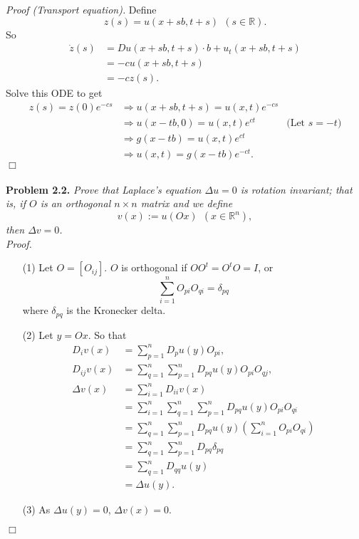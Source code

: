 \documentclass{article}
\begin{document}
\emph{Proof (Transport equation).}
Define
\[
  z(s) = u(x+sb,t+s) \:\: (s \in \mathbb{R}).
\]
So
\begin{align*}
  \dot{z}(s)
  &= Du(x+sb,t+s) \cdot b + u_t(x+sb,t+s) \\
  &= -cu(x+sb,t+s) \\
  &= -cz(s).
\end{align*}
Solve this ODE to get
\begin{align*}
  z(s) = z(0) e^{-cs}
  &\Longrightarrow
  u(x+sb,t+s) = u(x,t) e^{-cs} \\
  &\Longrightarrow
  u(x-tb,0) = u(x,t) e^{ct}
    &\text{(Let $s = -t$)} \\
  &\Longrightarrow
  g(x-tb) = u(x,t) e^{ct} \\
  &\Longrightarrow
  u(x,t) = g(x-tb) e^{-ct}.
\end{align*}
$\Box$ \\\\






\textbf{Problem 2.2.}
\emph{Prove that Laplace's equation $\Delta u = 0$ is rotation invariant;
that is, if $O$ is an orthogonal $n \times n$ matrix and we define
\[
  v(x) := u(Ox) \:\:(x \in \mathbb{R}^n),
\]
then $\Delta v = 0$.} \\

\emph{Proof.}
\begin{enumerate}
\item[(1)]
Let $O = [O_{ij}]$.
$O$ is orthogonal if $OO^{t} = O^{t}O = I$,
or
\[
  \sum_{i=1}^{n} O_{pi} O_{qi} = \delta_{pq}
\]
where $\delta_{pq}$ is the Kronecker delta.
\item[(2)]
Let $y = Ox$.
So that
\begin{align*}
  D_i v(x)
  &= \sum_{p=1}^{n} D_p u(y) O_{pi}, \\
  D_{ij} v(x)
  &= \sum_{q=1}^{n} \sum_{p=1}^{n} D_{pq}u(y) O_{pi} O_{qj}, \\
  \Delta v(x)
  &= \sum_{i=1}^{n} D_{ii} v(x) \\
  &= \sum_{i=1}^{n} \sum_{q=1}^{n}\sum_{p=1}^{n} D_{pq}u(y) O_{pi} O_{qi} \\
  &= \sum_{q=1}^{n} \sum_{p=1}^{n} D_{pq} u(y) \left( \sum_{i=1}^{n} O_{pi} O_{qi} \right) \\
  &= \sum_{q=1}^{n} \sum_{p=1}^{n} D_{pq} \delta_{pq} \\
  &= \sum_{q=1}^{n} D_{qq}u(y) \\
  &= \Delta u(y).
\end{align*}
\item[(3)]
As $\Delta u(y) = 0$, $\Delta v(x) = 0$.
\end{enumerate}
$\Box$ \\\\



\end{document}
